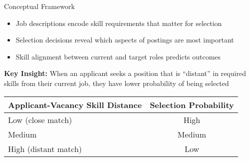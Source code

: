 \documentclass{beamer}
\begin{document}
\begin{frame}{Conceptual Framework}
\begin{itemize}
    \item Job descriptions encode skill requirements that matter for selection
    \item Selection decisions reveal which aspects of postings are most important
    \item Skill alignment between current and target roles predicts outcomes
\end{itemize}

\begin{tcolorbox}[colback=boxbackground,colframe=boxframe,sharp corners]
\textbf{Key Insight:} When an applicant seeks a position that is ``distant'' in required skills from their current job, they have lower probability of being selected
\end{tcolorbox}

\begin{table}
\centering
\begin{tabular}{l c}
\toprule
\textbf{Applicant-Vacancy Skill Distance} & \textbf{Selection Probability} \\
\midrule
Low (close match) & High \\
Medium & Medium \\
High (distant match) & Low \\
\bottomrule
\end{tabular}
\end{table}
\end{frame}
\end{document}
